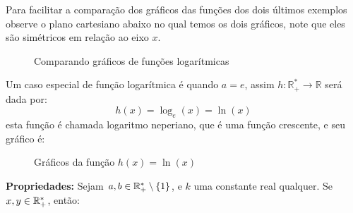  Para facilitar a comparação dos gráficos das funções dos dois últimos exemplos observe o plano cartesiano abaixo no qual temos os dois gráficos, note que eles são simétricos em relação ao eixo $x$.

   \begin{figure}[H]
 \centering
    \caption{Comparando gráficos de funções logarítmicas}
  \end{figure}


  \begin{exem} \label{ex:log-e}
   Um caso especial de função logarítmica é quando $a= e$, assim $h: \mathbb{R_{+}^{*}} \rightarrow \mathbb{R} $ será dada por:
    \[h(x) = \log_{e}(x)= \ln(x)\]
  esta função é chamada logaritmo neperiano, que é uma função crescente, e seu gráfico é:

   \begin{figure}[H]
    \centering
    \caption{Gráficos da função $h(x)= \ln(x)$}
   \end{figure}

 \end{exem}

  \textbf{Propriedades:} Sejam $a, b \in \mathbb{R}_{+}^{*} \setminus \{1\}$, e $k$ uma constante real qualquer. Se $x, y \in \mathbb{R}_{+}^{*}$, então:

